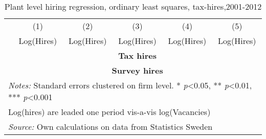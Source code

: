 \begin{table}[htbp]\centering
\def\sym#1{\ifmmode^{#1}\else\(^{#1}\)\fi}
\caption{Plant level hiring regression, ordinary least squares, tax-hires,2001-2012}
\begin{tabular}{l*{5}{c}}
\hline\hline
                &\multicolumn{1}{c}{(1)}&\multicolumn{1}{c}{(2)}&\multicolumn{1}{c}{(3)}&\multicolumn{1}{c}{(4)}&\multicolumn{1}{c}{(5)}\\
                &\multicolumn{1}{c}{Log(Hires)}&\multicolumn{1}{c}{Log(Hires)}&\multicolumn{1}{c}{Log(Hires)}&\multicolumn{1}{c}{Log(Hires)}&\multicolumn{1}{c}{Log(Hires)}\\
\hline

\hline
			    &\multicolumn{5}{c}{\textbf{Tax hires}} \\
\hline


\hline 

\hline

\hline
			    &\multicolumn{5}{c}{\textbf{Survey hires}} \\
\hline



\hline 


\hline\hline
\multicolumn{6}{l}{\footnotesize \emph{Notes:} Standard errors clustered on firm level. * \emph{p}<0.05, ** \emph{p}<0.01, *** \emph{p}<0.001}\\
\multicolumn{6}{l}{\footnotesize Log(hires) are leaded one period vis-a-vis log(Vacancies)}\\
\multicolumn{6}{l}{\footnotesize \emph{Source:} Own calculations on data from Statistics Sweden}\\
\end{tabular}
\end{table}